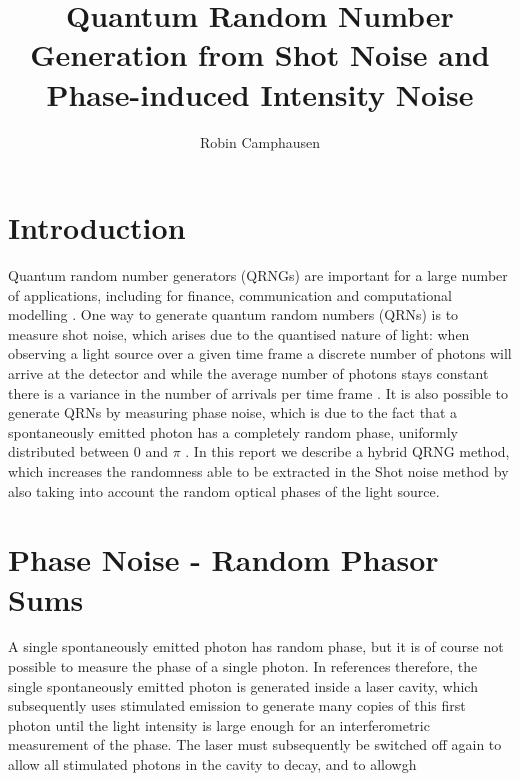 \documentclass[]{article}
\title{Quantum Random Number Generation from Shot Noise and Phase-induced Intensity Noise}
\author{Robin Camphausen}
\date{}
\begin{document}
\maketitle
\section{Introduction}
Quantum random number generators (QRNGs) are important for a large number of applications, including for finance, communication and computational modelling \cite{herrero-collantes_quantum_2017}. One way to generate quantum random numbers (QRNs) is to measure shot noise, which arises due to the quantised nature of light: when observing a light source over a given time frame a discrete number of photons will arrive at the detector and while the average number of photons stays constant there is a variance in the number of arrivals per time frame \cite{sanguinetti_quantum_2014}. It is also possible to generate QRNs by measuring phase noise, which is due to the fact that a spontaneously emitted photon has a completely random phase, uniformly distributed between $0$ and $\pi$ \cite{xu_ultrafast_2012,abellan_ultra-fast_2014}. In this report we describe a hybrid QRNG method, which increases the randomness able to be extracted in the Shot noise method by also taking into account the random optical phases of the light source.

\section{Phase Noise - Random Phasor Sums}
A single spontaneously emitted photon has random phase, but it is of course not possible to measure the phase of a single photon. In references \cite{abellan_ultra-fast_2014,mitchell_strong_2015,abellan_generation_2015} therefore, the single spontaneously emitted photon is generated inside a laser cavity, which subsequently uses stimulated emission to generate many copies of this first photon until the light intensity is large enough for an interferometric measurement of the phase. The laser must subsequently be switched off again to allow all stimulated photons in the cavity to decay, and to allowgh


{}
\end{document}
